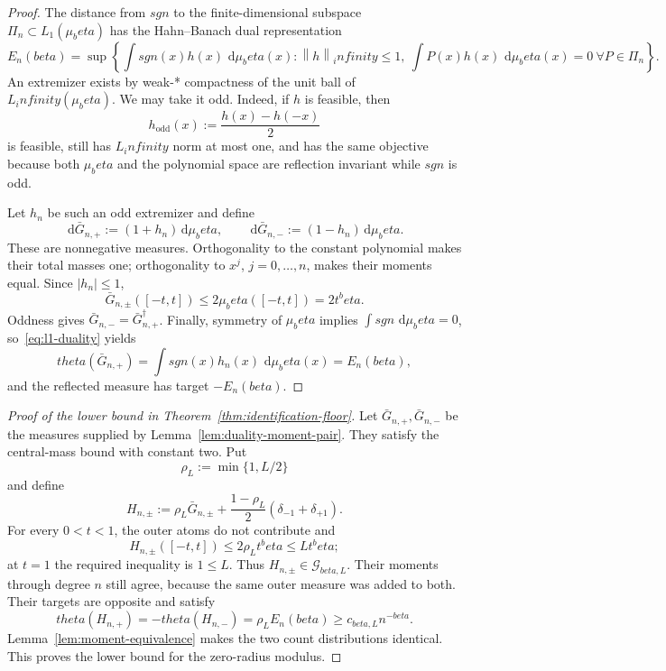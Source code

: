 \documentclass[11pt]{article}
\def\beta{beta}%
\def\theta{theta}%
\def\sgn{sgn}%
\def\infty{infinity}%
\newcommand{\sgn}{\operatorname{sgn}}
\newcommand{\calG}{\mathcal G}
\newcommand{\norm}[1]{\left\lVert#1\right\rVert}
\newcommand{\dd}{\,\mathrm d}
\begin{document}
\begin{proof}
The distance from $\sgn$ to the finite-dimensional subspace $\Pi_n\subset L_1(\mu_\beta)$ has the Hahn--Banach dual representation
\begin{equation}
\label{eq:l1-duality}
E_n(\beta)
=
\sup\left\{
\int \sgn(x)h(x)\,\dd\mu_\beta(x):
\norm h_\infty\le1,
\ \int P(x)h(x)\,\dd\mu_\beta(x)=0
\ \forall P\in\Pi_n
\right\}.
\end{equation}
An extremizer exists by weak-* compactness of the unit ball of $L_\infty(\mu_\beta)$.  We may take it odd.  Indeed, if $h$ is feasible, then
\[
h_{\mathrm{odd}}(x):=\frac{h(x)-h(-x)}2
\]
is feasible, still has $L_\infty$ norm at most one, and has the same objective because both $\mu_\beta$ and the polynomial space are reflection invariant while $\sgn$ is odd.

Let $h_n$ be such an odd extremizer and define
\[
\dd\bar G_{n,+}:=(1+h_n)\dd\mu_\beta,
\qquad
\dd\bar G_{n,-}:=(1-h_n)\dd\mu_\beta.
\]
These are nonnegative measures.  Orthogonality to the constant polynomial makes their total masses one; orthogonality to $x^j$, $j=0,\dots,n$, makes their moments equal.  Since $|h_n|\le1$,
\[
\bar G_{n,\pm}([-t,t])
\le2\mu_\beta([-t,t])
=2t^\beta.
\]
Oddness gives $\bar G_{n,-}=\bar G_{n,+}^\dagger$.  Finally, symmetry of $\mu_\beta$ implies $\int\sgn\,\dd\mu_\beta=0$, so~\eqref{eq:l1-duality} yields
\[
\theta(\bar G_{n,+})
=\int\sgn(x)h_n(x)\,\dd\mu_\beta(x)
=E_n(\beta),
\]
and the reflected measure has target $-E_n(\beta)$.
\end{proof}

\begin{proof}[Proof of the lower bound in Theorem~\ref{thm:identification-floor}]
Let $\bar G_{n,+},\bar G_{n,-}$ be the measures supplied by Lemma~\ref{lem:duality-moment-pair}.  They satisfy the central-mass bound with constant two.  Put
\[
\rho_L:=\min\{1,L/2\}
\]
and define
\[
H_{n,\pm}
:=
\rho_L\bar G_{n,\pm}
+\frac{1-\rho_L}{2}(\delta_{-1}+\delta_{+1}).
\]
For every $0<t<1$, the outer atoms do not contribute and
\[
H_{n,\pm}([-t,t])
\le2\rho_Lt^\beta
\le Lt^\beta;
\]
at $t=1$ the required inequality is $1\le L$.  Thus $H_{n,\pm}\in\calG_{\beta,L}$.  Their moments through degree $n$ still agree, because the same outer measure was added to both.  Their targets are opposite and satisfy
\[
\theta(H_{n,+})=-\theta(H_{n,-})
=\rho_LE_n(\beta)
\ge c_{\beta,L}n^{-\beta}.
\]
Lemma~\ref{lem:moment-equivalence} makes the two count distributions identical.  This proves the lower bound for the zero-radius modulus.
\end{proof}
\end{document}
